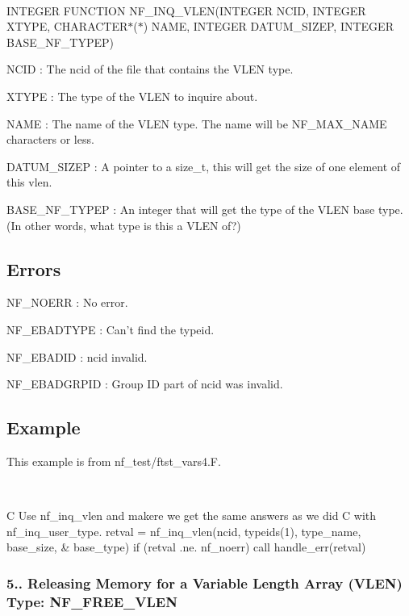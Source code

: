  

I\+N\+T\+E\+G\+ER F\+U\+N\+C\+T\+I\+ON N\+F\+\_\+\+I\+N\+Q\+\_\+\+V\+L\+EN(I\+N\+T\+E\+G\+ER N\+C\+ID, I\+N\+T\+E\+G\+ER X\+T\+Y\+PE, C\+H\+A\+R\+A\+C\+T\+E\+R$\ast$($\ast$) N\+A\+ME, I\+N\+T\+E\+G\+ER D\+A\+T\+U\+M\+\_\+\+S\+I\+Z\+EP, I\+N\+T\+E\+G\+ER B\+A\+S\+E\+\_\+\+N\+F\+\_\+\+T\+Y\+P\+EP)

{\ttfamily N\+C\+ID} \+: The ncid of the file that contains the V\+L\+EN type.

{\ttfamily X\+T\+Y\+PE} \+: The type of the V\+L\+EN to inquire about.

{\ttfamily N\+A\+ME} \+: The name of the V\+L\+EN type. The name will be N\+F\+\_\+\+M\+A\+X\+\_\+\+N\+A\+ME characters or less.

{\ttfamily D\+A\+T\+U\+M\+\_\+\+S\+I\+Z\+EP} \+: A pointer to a size\+\_\+t, this will get the size of one element of this vlen.

{\ttfamily B\+A\+S\+E\+\_\+\+N\+F\+\_\+\+T\+Y\+P\+EP} \+: An integer that will get the type of the V\+L\+EN base type. (In other words, what type is this a V\+L\+EN of?)

\subsection*{Errors }

{\ttfamily N\+F\+\_\+\+N\+O\+E\+RR} \+: No error.

{\ttfamily N\+F\+\_\+\+E\+B\+A\+D\+T\+Y\+PE} \+: Can’t find the typeid.

{\ttfamily N\+F\+\_\+\+E\+B\+A\+D\+ID} \+: ncid invalid.

{\ttfamily N\+F\+\_\+\+E\+B\+A\+D\+G\+R\+P\+ID} \+: Group ID part of ncid was invalid.

\subsection*{Example }

This example is from nf\+\_\+test/ftst\+\_\+vars4.\+F.

 

C Use nf\+\_\+inq\+\_\+vlen and makere we get the same answers as we did C with nf\+\_\+inq\+\_\+user\+\_\+type. retval = nf\+\_\+inq\+\_\+vlen(ncid, typeids(1), type\+\_\+name, base\+\_\+size, \& base\+\_\+type) if (retval .ne. nf\+\_\+noerr) call handle\+\_\+err(retval)

\subsubsection*{5.. Releasing Memory for a Variable Length Array (V\+L\+EN) Type\+: N\+F\+\_\+\+F\+R\+E\+E\+\_\+\+V\+L\+EN}

